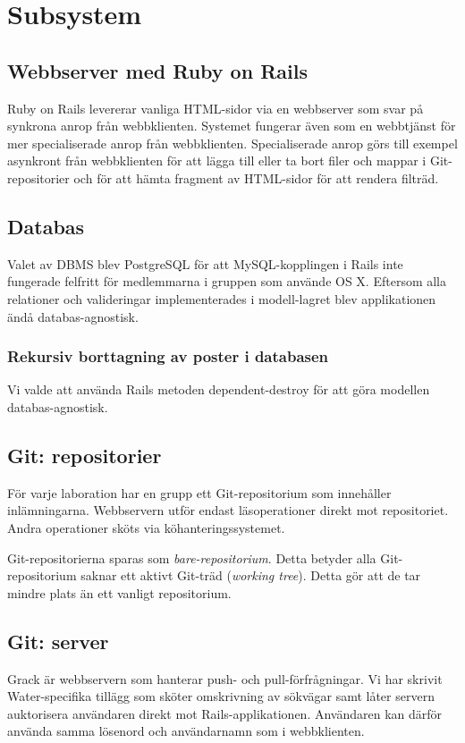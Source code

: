 \section{Subsystem}
\subsection{Webbserver med Ruby on Rails}
Ruby on Rails levererar vanliga HTML-sidor via en webbserver som svar på synkrona anrop från webbklienten. Systemet fungerar även som en webbtjänst för mer specialiserade anrop från webbklienten. Specialiserade anrop görs till exempel asynkront från webbklienten för att lägga till eller ta bort filer och mappar i Git-repositorier och för att hämta fragment av HTML-sidor för att rendera filträd.
\subsection{Databas}
Valet av DBMS blev PostgreSQL för att MySQL-kopplingen i Rails inte fungerade felfritt för medlemmarna i gruppen som använde OS X. Eftersom alla relationer och valideringar implementerades i modell-lagret blev applikationen ändå databas-agnostisk.
\subsubsection{Rekursiv borttagning av poster i databasen}
Vi valde att använda Rails metoden dependent-destroy för att göra modellen databas-agnostisk.
\subsection{Git: repositorier}
För varje laboration har en grupp ett Git-repositorium som innehåller inlämningarna. Webbservern utför endast läsoperationer direkt mot repositoriet. Andra operationer sköts via köhanteringssystemet.

Git-repositorierna sparas som \emph{bare-repositorium}. Detta betyder alla Git-repositorium saknar ett aktivt Git-träd (\emph{working tree}). Detta gör att de tar mindre plats än ett vanligt repositorium.
\subsection{Git: server}
Grack är webbservern som hanterar push- och pull-förfrågningar. Vi har skrivit Water-specifika tillägg som sköter omskrivning av sökvägar samt låter servern auktorisera användaren direkt mot Rails-applikationen. Användaren kan därför använda samma lösenord och användarnamn som i webbklienten.


